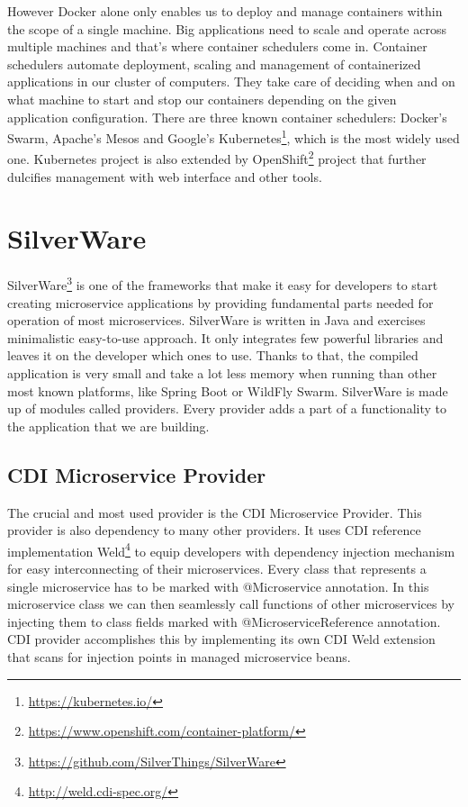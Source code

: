 \documentclass[12pt,oneside]{fithesis2}
\begin{document}

However Docker alone only enables us to deploy and manage containers within the scope of a single machine. Big applications need to scale and operate across multiple machines and that's where container schedulers come in. Container schedulers automate deployment, scaling and management of containerized applications in our cluster of computers. They take care of deciding when and on what machine to start and stop our containers depending on the given application configuration. There are three known container schedulers: Docker's Swarm, Apache's Mesos and Google's Kubernetes\footnote{\url{https://kubernetes.io/}}, which is the most widely used one. Kubernetes project is also extended by OpenShift\footnote{\url{https://www.openshift.com/container-platform/}} project that further dulcifies management with web interface and other tools.

\section{SilverWare}

SilverWare\footnote{\url{https://github.com/SilverThings/SilverWare}} is one of the frameworks that make it easy for developers to start creating microservice applications by providing fundamental parts needed for operation of most microservices. SilverWare is written in Java and exercises minimalistic easy-to-use approach. It only integrates few powerful libraries and leaves it on the developer which ones to use. Thanks to that, the compiled application is very small and take a lot less memory when running than other most known platforms, like Spring Boot or WildFly Swarm. SilverWare is made up of modules called providers. Every provider adds a part of a functionality to the application that we are building.

\subsection{CDI Microservice Provider}
The crucial and most used provider is the CDI Microservice Provider. This provider is also dependency to many other providers. It uses CDI\cite{cdi_tutorial} reference implementation Weld\footnote{\url{http://weld.cdi-spec.org/}} to equip developers with dependency injection mechanism for easy interconnecting of their microservices. Every class that represents a single microservice has to be marked with @Microservice annotation. In this microservice class we can then seamlessly call functions of other microservices by injecting them to class fields marked with @MicroserviceReference annotation. CDI provider accomplishes this by implementing its own CDI Weld extension that scans for injection points in managed microservice beans.
\end{document}
